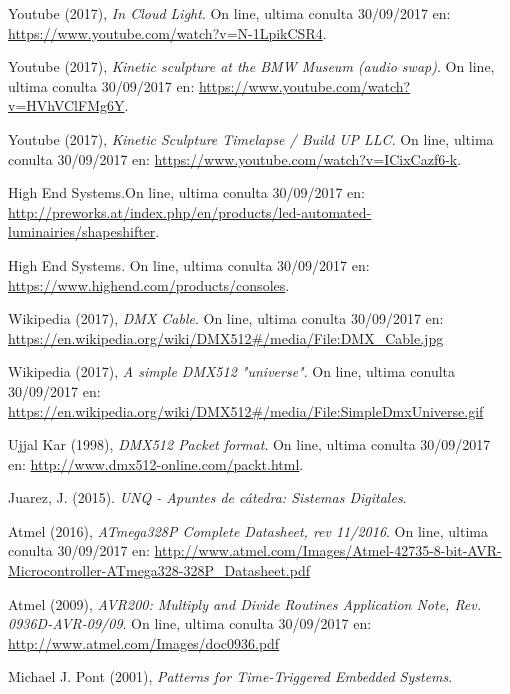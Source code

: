 \begin{thebibliography}{9}
	 Youtube (2017), \textit{In Cloud Light}. On line, ultima conulta 30/09/2017 en: \url{https://www.youtube.com/watch?v=N-1LpikCSR4}.
	
	 Youtube (2017), \textit{Kinetic sculpture at the BMW Museum (audio swap)}. On line, ultima conulta 30/09/2017 en: \url{https://www.youtube.com/watch?v=HVhVClFMg6Y}. 
	
	 Youtube (2017), \textit{Kinetic Sculpture Timelapse / Build UP LLC}. On line, ultima conulta 30/09/2017 en: \url{https://www.youtube.com/watch?v=ICixCazf6-k}.
	
	 High End Systems.On line, ultima conulta 30/09/2017 en: \url{http://preworks.at/index.php/en/products/led-automated-luminairies/shapeshifter}.
	
	 High End Systems. On line, ultima conulta 30/09/2017 en: \url{https://www.highend.com/products/consoles}.
	
	 Wikipedia (2017), \textit{DMX Cable}. On line, ultima conulta 30/09/2017 en: \url{https://en.wikipedia.org/wiki/DMX512#/media/File:DMX_Cable.jpg}
	
	 Wikipedia (2017), \textit{A simple DMX512 "universe"}. On line, ultima conulta 30/09/2017 en: \url{https://en.wikipedia.org/wiki/DMX512#/media/File:SimpleDmxUniverse.gif}
	
	 Ujjal Kar (1998), \textit{DMX512 Packet format}. On line, ultima conulta 30/09/2017 en: \url{http://www.dmx512-online.com/packt.html}.
	
	 Juarez, J. (2015). \textit{UNQ - Apuntes de cátedra: Sistemas Digitales}.
	
	 Atmel (2016), \textit{ATmega328P Complete Datasheet, rev 11/2016}. On line, ultima conulta 30/09/2017 en: \url{http://www.atmel.com/Images/Atmel-42735-8-bit-AVR-Microcontroller-ATmega328-328P_Datasheet.pdf}
	
	 Atmel (2009), \textit{AVR200: Multiply and Divide Routines Application Note, Rev. 0936D-AVR-09/09}. On line, ultima conulta 30/09/2017 en: \href{http://www.atmel.com/Images/doc0936.pdf}{http://www.atmel.com/Images/doc0936.pdf}
	
	 Michael J. Pont (2001), \textit{Patterns for Time-Triggered Embedded Systems}. 
	
\end{thebibliography}